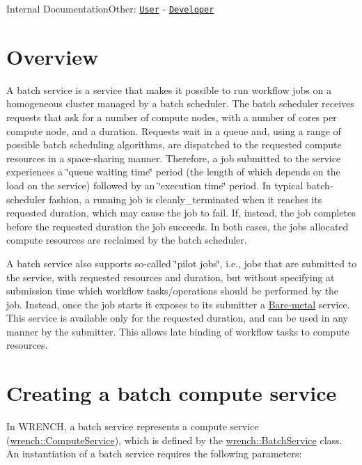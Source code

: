 Internal DocumentationOther\+: \href{../user/guide-batch.html}{\tt User} -\/ \href{../developer/guide-batch.html}{\tt Developer}\hypertarget{guide-batch_guide-batch-overview}{}\section{Overview}\label{guide-batch_guide-batch-overview}
A batch service is a service that makes it possible to run workflow jobs on a homogeneous cluster managed by a batch scheduler. The batch scheduler receives requests that ask for a number of compute nodes, with a number of cores per compute node, and a duration. Requests wait in a queue and, using a range of possible batch scheduling algorithms, are dispatched to the requested compute resources in a space-\/sharing manner. Therefore, a job submitted to the service experiences a \char`\"{}queue waiting time\char`\"{} period (the length of which depends on the load on the service) followed by an \char`\"{}execution time\char`\"{} period. In typical batch-\/scheduler fashion, a running job is cleanly\+\_\+terminated when it reaches its requested duration, which may cause the job to fail. If, instead, the job completes before the requested duration the job succeeds. In both cases, the job\textquotesingle{}s allocated compute resources are reclaimed by the batch scheduler.

A batch service also supports so-\/called \char`\"{}pilot jobs\char`\"{}, i.\+e., jobs that are submitted to the service, with requested resources and duration, but without specifying at submission time which workflow tasks/operations should be performed by the job. Instead, once the job starts it exposes to its submitter a \hyperlink{guide-baremetal}{Bare-\/metal} service. This service is available only for the requested duration, and can be used in any manner by the submitter. This allows late binding of workflow tasks to compute resources.\hypertarget{guide-batch_guide-batch-creating}{}\section{Creating a batch compute service}\label{guide-batch_guide-batch-creating}
In W\+R\+E\+N\+CH, a batch service represents a compute service ({\ttfamily \hyperlink{classwrench_1_1_compute_service}{wrench\+::\+Compute\+Service}}), which is defined by the {\ttfamily \hyperlink{classwrench_1_1_batch_service}{wrench\+::\+Batch\+Service}} class. An instantiation of a batch service requires the following parameters\+:


